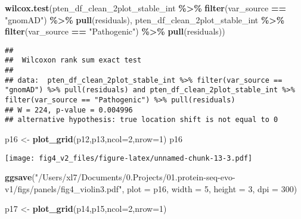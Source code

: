 \documentclass[
]{article}
\newenvironment{Shaded}{\begin{snugshade}}{\end{snugshade}}
\newcommand{\AttributeTok}[1]{\textcolor[rgb]{0.13,0.29,0.53}{#1}}
\newcommand{\DecValTok}[1]{\textcolor[rgb]{0.00,0.00,0.81}{#1}}
\newcommand{\FunctionTok}[1]{\textcolor[rgb]{0.13,0.29,0.53}{\textbf{#1}}}
\newcommand{\NormalTok}[1]{#1}
\newcommand{\OtherTok}[1]{\textcolor[rgb]{0.56,0.35,0.01}{#1}}
\newcommand{\SpecialCharTok}[1]{\textcolor[rgb]{0.81,0.36,0.00}{\textbf{#1}}}
\newcommand{\StringTok}[1]{\textcolor[rgb]{0.31,0.60,0.02}{#1}}
\begin{document}
\begin{Shaded}
\begin{Highlighting}[]
\FunctionTok{wilcox.test}\NormalTok{(pten\_df\_clean\_2plot\_stable\_int }\SpecialCharTok{\%\textgreater{}\%} \FunctionTok{filter}\NormalTok{(var\_source }\SpecialCharTok{==} \StringTok{"gnomAD"}\NormalTok{)  }\SpecialCharTok{\%\textgreater{}\%} \FunctionTok{pull}\NormalTok{(residuals),}
\NormalTok{            pten\_df\_clean\_2plot\_stable\_int }\SpecialCharTok{\%\textgreater{}\%} \FunctionTok{filter}\NormalTok{(var\_source }\SpecialCharTok{==} \StringTok{"Pathogenic"}\NormalTok{)  }\SpecialCharTok{\%\textgreater{}\%} \FunctionTok{pull}\NormalTok{(residuals))}
\end{Highlighting}
\end{Shaded}

\begin{verbatim}
## 
##  Wilcoxon rank sum exact test
## 
## data:  pten_df_clean_2plot_stable_int %>% filter(var_source == "gnomAD") %>% pull(residuals) and pten_df_clean_2plot_stable_int %>% filter(var_source == "Pathogenic") %>% pull(residuals)
## W = 224, p-value = 0.004996
## alternative hypothesis: true location shift is not equal to 0
\end{verbatim}

\begin{Shaded}
\begin{Highlighting}[]
\NormalTok{p16 }\OtherTok{\textless{}{-}} \FunctionTok{plot\_grid}\NormalTok{(p12,p13,}\AttributeTok{ncol=}\DecValTok{2}\NormalTok{,}\AttributeTok{nrow=}\DecValTok{1}\NormalTok{)}
\NormalTok{p16}
\end{Highlighting}
\end{Shaded}

\texttt{[image: fig4\_v2\_files/figure-latex/unnamed-chunk-13-3.pdf]}

\begin{Shaded}
\begin{Highlighting}[]
\FunctionTok{ggsave}\NormalTok{(}\StringTok{"/Users/xl7/Documents/0.Projects/01.protein{-}seq{-}evo{-}v1/figs/panels/fig4\_violin3.pdf"}\NormalTok{, }
       \AttributeTok{plot =}\NormalTok{ p16, }\AttributeTok{width =} \DecValTok{5}\NormalTok{, }\AttributeTok{height =} \DecValTok{3}\NormalTok{, }\AttributeTok{dpi =} \DecValTok{300}\NormalTok{)}
\end{Highlighting}
\end{Shaded}

\begin{Shaded}
\begin{Highlighting}[]
\NormalTok{p17 }\OtherTok{\textless{}{-}} \FunctionTok{plot\_grid}\NormalTok{(p14,p15,}\AttributeTok{ncol=}\DecValTok{2}\NormalTok{,}\AttributeTok{nrow=}\DecValTok{1}\NormalTok{)}
\end{Highlighting}
\end{Shaded}
\end{document}
